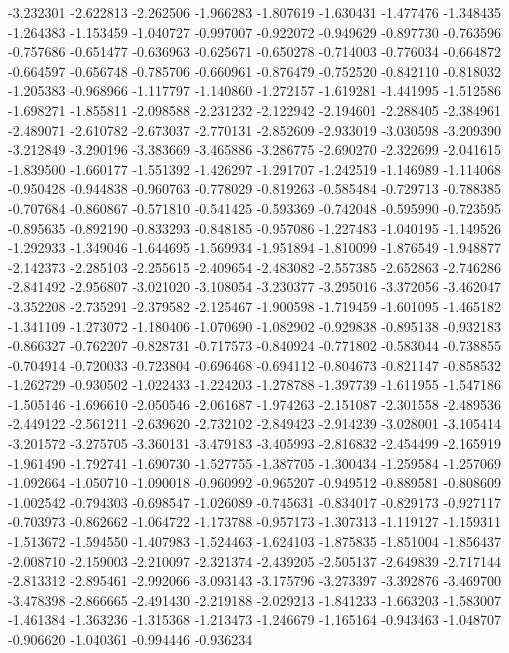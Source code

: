 -3.232301
-2.622813
-2.262506
-1.966283
-1.807619
-1.630431
-1.477476
-1.348435
-1.264383
-1.153459
-1.040727
-0.997007
-0.922072
-0.949629
-0.897730
-0.763596
-0.757686
-0.651477
-0.636963
-0.625671
-0.650278
-0.714003
-0.776034
-0.664872
-0.664597
-0.656748
-0.785706
-0.660961
-0.876479
-0.752520
-0.842110
-0.818032
-1.205383
-0.968966
-1.117797
-1.140860
-1.272157
-1.619281
-1.441995
-1.512586
-1.698271
-1.855811
-2.098588
-2.231232
-2.122942
-2.194601
-2.288405
-2.384961
-2.489071
-2.610782
-2.673037
-2.770131
-2.852609
-2.933019
-3.030598
-3.209390
-3.212849
-3.290196
-3.383669
-3.465886
-3.286775
-2.690270
-2.322699
-2.041615
-1.839500
-1.660177
-1.551392
-1.426297
-1.291707
-1.242519
-1.146989
-1.114068
-0.950428
-0.944838
-0.960763
-0.778029
-0.819263
-0.585484
-0.729713
-0.788385
-0.707684
-0.860867
-0.571810
-0.541425
-0.593369
-0.742048
-0.595990
-0.723595
-0.895635
-0.892190
-0.833293
-0.848185
-0.957086
-1.227483
-1.040195
-1.149526
-1.292933
-1.349046
-1.644695
-1.569934
-1.951894
-1.810099
-1.876549
-1.948877
-2.142373
-2.285103
-2.255615
-2.409654
-2.483082
-2.557385
-2.652863
-2.746286
-2.841492
-2.956807
-3.021020
-3.108054
-3.230377
-3.295016
-3.372056
-3.462047
-3.352208
-2.735291
-2.379582
-2.125467
-1.900598
-1.719459
-1.601095
-1.465182
-1.341109
-1.273072
-1.180406
-1.070690
-1.082902
-0.929838
-0.895138
-0.932183
-0.866327
-0.762207
-0.828731
-0.717573
-0.840924
-0.771802
-0.583044
-0.738855
-0.704914
-0.720033
-0.723804
-0.696468
-0.694112
-0.804673
-0.821147
-0.858532
-1.262729
-0.930502
-1.022433
-1.224203
-1.278788
-1.397739
-1.611955
-1.547186
-1.505146
-1.696610
-2.050546
-2.061687
-1.974263
-2.151087
-2.301558
-2.489536
-2.449122
-2.561211
-2.639620
-2.732102
-2.849423
-2.914239
-3.028001
-3.105414
-3.201572
-3.275705
-3.360131
-3.479183
-3.405993
-2.816832
-2.454499
-2.165919
-1.961490
-1.792741
-1.690730
-1.527755
-1.387705
-1.300434
-1.259584
-1.257069
-1.092664
-1.050710
-1.090018
-0.960992
-0.965207
-0.949512
-0.889581
-0.808609
-1.002542
-0.794303
-0.698547
-1.026089
-0.745631
-0.834017
-0.829173
-0.927117
-0.703973
-0.862662
-1.064722
-1.173788
-0.957173
-1.307313
-1.119127
-1.159311
-1.513672
-1.594550
-1.407983
-1.524463
-1.624103
-1.875835
-1.851004
-1.856437
-2.008710
-2.159003
-2.210097
-2.321374
-2.439205
-2.505137
-2.649839
-2.717144
-2.813312
-2.895461
-2.992066
-3.093143
-3.175796
-3.273397
-3.392876
-3.469700
-3.478398
-2.866665
-2.491430
-2.219188
-2.029213
-1.841233
-1.663203
-1.583007
-1.461384
-1.363236
-1.315368
-1.213473
-1.246679
-1.165164
-0.943463
-1.048707
-0.906620
-1.040361
-0.994446
-0.936234
